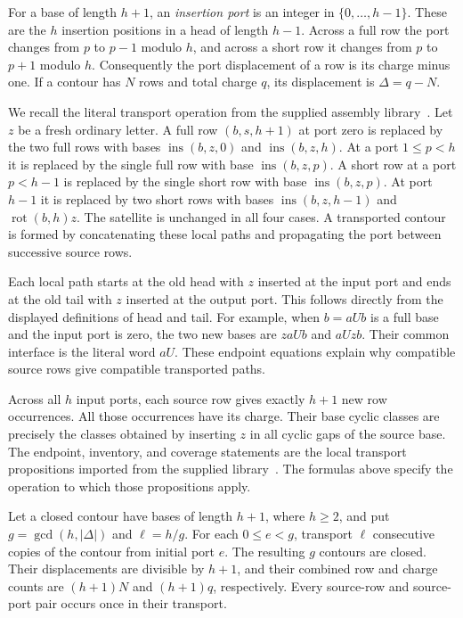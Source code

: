 For a base of length $h+1$, an \emph{insertion port} is an integer in
$\{0,\ldots,h-1\}$. These are the $h$ insertion positions in a head of
length $h-1$. Across a full row the port changes from $p$ to $p-1$ modulo
$h$, and across a short row it changes from $p$ to $p+1$ modulo $h$.
Consequently the port displacement of a row is its charge minus one.
If a contour has $N$ rows and total charge $q$, its displacement is
$\Delta=q-N$.

We recall the literal transport operation from the supplied assembly
library~\cite{pantone-core}. Let $z$ be a fresh ordinary letter. A full
row $(b,s,h+1)$ at port zero is replaced by the two full rows with bases
$\operatorname{ins}(b,z,0)$ and $\operatorname{ins}(b,z,h)$.
At a port $1\le p<h$ it is replaced by the single full row with base
$\operatorname{ins}(b,z,p)$. A short row at a port $p<h-1$ is replaced
by the single short row with base $\operatorname{ins}(b,z,p)$.
At port $h-1$ it is replaced by two short rows with bases
$\operatorname{ins}(b,z,h-1)$ and
$\operatorname{rot}(b,h)z$. The satellite is unchanged in all four cases.
A transported contour is formed by concatenating these local paths and
propagating the port between successive source rows.

Each local path starts at the old head with $z$ inserted at the input
port and ends at the old tail with $z$ inserted at the output port.
This follows directly from the displayed definitions of head and tail.
For example, when $b=aUb$ is a full base and the input port is zero,
the two new bases are $zaUb$ and $aUzb$. Their common interface is the
literal word $aU$. These endpoint equations explain why compatible
source rows give compatible transported paths.

Across all $h$ input ports, each source row gives exactly $h+1$ new row
occurrences. All those occurrences have its charge. Their base cyclic
classes are precisely the classes obtained by inserting $z$ in all cyclic
gaps of the source base. The endpoint, inventory, and coverage statements
are the local transport propositions imported from the supplied
library~\cite{pantone-core}. The formulas above specify the operation to
which those propositions apply.

\begin{lemma}\label{lem-assembly-orbits}
Let a closed contour have bases of length $h+1$, where $h\ge2$, and put
$g=\gcd(h,|\Delta|)$ and $\ell=h/g$. For each $0\le e<g$, transport
$\ell$ consecutive copies of the contour from initial port $e$.
The resulting $g$ contours are closed. Their displacements are divisible
by $h+1$, and their combined row and charge counts are $(h+1)N$ and
$(h+1)q$, respectively. Every source-row and source-port pair occurs once
in their transport.
\end{lemma}

